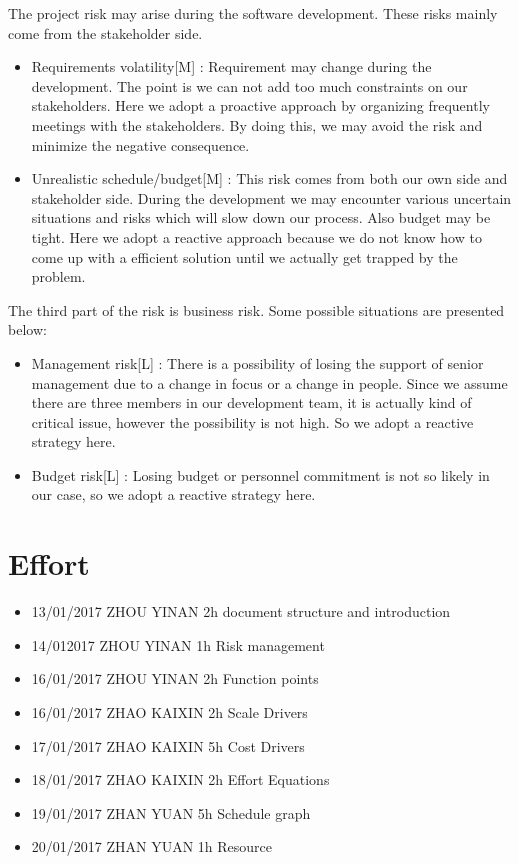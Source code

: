 \documentclass{article}
\begin{document}
The project risk may arise during the software development. These risks mainly come from the stakeholder side.
\begin{itemize}
	\item Requirements volatility[M] : Requirement may change during the development. The point is we can not add too much constraints on our stakeholders. Here we adopt a proactive approach by organizing frequently meetings with the stakeholders. By doing this, we may avoid the risk and  minimize the negative consequence.
	\item Unrealistic schedule/budget[M] : This risk comes from both our own side and stakeholder side. During the development we may encounter various uncertain situations and risks which will slow down our process. Also budget may be tight. Here we adopt a reactive approach because we do not know how to come up with a efficient solution until we actually get trapped by the problem.
\end{itemize}
The third part of the risk is business risk. Some possible situations are presented below:
\begin{itemize}
	\item Management risk[L] : There is a possibility of losing the support of senior management due to a change in focus or a change in people. Since we assume there are three members in our development team, it is actually kind of critical issue, however the possibility is not high. So we adopt a reactive strategy here.
	\item Budget risk[L] : Losing budget or personnel commitment is not so likely in our case, so we adopt a reactive strategy here.
\end{itemize}


\newpage

\section{Effort}
\begin{itemize}
	\item 13/01/2017 ZHOU YINAN 2h document structure and introduction
	\item 14/012017	ZHOU YINAN 1h	Risk management
	\item 16/01/2017 ZHOU YINAN	2h Function points
	\item 16/01/2017 ZHAO KAIXIN 2h Scale Drivers
	\item 17/01/2017 ZHAO KAIXIN 5h Cost Drivers
	\item 18/01/2017 ZHAO KAIXIN 2h Effort Equations 
	\item 19/01/2017 ZHAN YUAN 5h Schedule graph
	\item 20/01/2017 ZHAN YUAN 1h Resource
\end{itemize}
\end{document}
